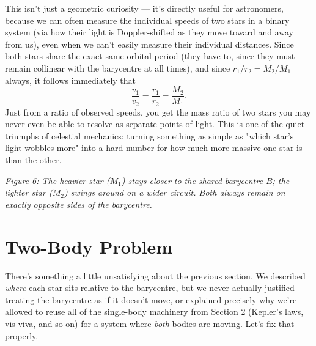 \documentclass[11pt]{article}
\begin{document}
This isn't just a geometric curiosity --- it's directly useful for astronomers, because we can
often measure the individual speeds of two stars in a binary system (via how their light is
Doppler-shifted as they move toward and away from us), even when we can't easily measure their
individual distances. Since both stars share the exact same orbital period (they have to, since
they must remain collinear with the barycentre at all times), and since $r_1/r_2=M_2/M_1$ always,
it follows immediately that
\[
\frac{v_1}{v_2} = \frac{r_1}{r_2} = \frac{M_2}{M_1}.
\]
Just from a ratio of observed speeds, you get the mass ratio of two stars you may never even be
able to resolve as separate points of light. This is one of the quiet triumphs of celestial
mechanics: turning something as simple as "which star's light wobbles more" into a hard number for
how much more massive one star is than the other.

\begin{center}
\end{center}
\begin{center}\textit{Figure 6: The heavier star ($M_1$) stays closer to the shared barycentre $B$;
the lighter star ($M_2$) swings around on a wider circuit. Both always remain on exactly opposite
sides of the barycentre.}\end{center}

\section{Two-Body Problem}

There's something a little unsatisfying about the previous section. We described \emph{where}
each star sits relative to the barycentre, but we never actually justified treating the barycentre
as if it doesn't move, or explained precisely why we're allowed to reuse all of the single-body
machinery from Section 2 (Kepler's laws, vis-viva, and so on) for a system where \emph{both}
bodies are moving. Let's fix that properly.
\end{document}
